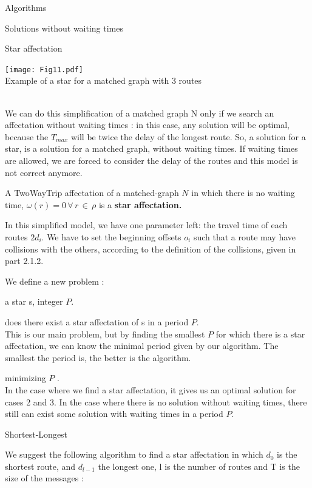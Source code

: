 \documentclass[a4paper,10pt]{report}
\begin{document}
\begin{chapter}{Algorithms}
\begin{section}{Solutions without waiting times}
\begin{subsection}{Star affectation}
{{\begin{center}
\texttt{[image: Fig11.pdf]}\\
Example of a star for a matched graph with 3 routes
\end{center}


}}\\


We can do this simplification of a matched graph N only if we search an affectation without waiting times : in this case, any solution
will be optimal, because the $T_{max}$ will be twice the delay of the longest route. So, a solution for a star, is a solution for a matched
graph, without waiting times. If waiting times are allowed, we are forced to consider the delay of the routes and this model is not
correct anymore.

A TwoWayTrip affectation of a matched-graph $N$ in which there is no waiting time, $\omega(r) = 0 \,\forall\, r \,\in\, \rho$ is a \bf{star affectation}.

In this simplified model, we have one parameter left: the travel time of each routes $2d_i$.
We have to set the beginning offsets $o_i$ such that a route may have collisions with the others, 
according to the definition of the collisions, given in part 2.1.2.


We define a new problem : 



 a star s, integer $P$.

 does there exist a star affectation of s in a period $P$.\\

This is our main problem, but by finding the smallest $P$ for which there is a star affectation, we can know 
the minimal period given by our algorithm. The smallest the period is, the better is the algorithm.


 minimizing $P$ .\\

In the case where we find a star affectation, it gives us an optimal solution for cases 2 and 3.
In the case where there is no solution without waiting times, there still can exist some solution with waiting times in 
a period $P$.
\end{subsection}
\begin{subsection}{Shortest-Longest}
 
We suggest the following algorithm to find a star affectation in which $d_0$ is the shortest route, and $d_{l-1}$ the longest one, 
l is the number of routes and T is the size of the messages :


\end{subsection}
\end{section}
\end{chapter}
\end{document}
